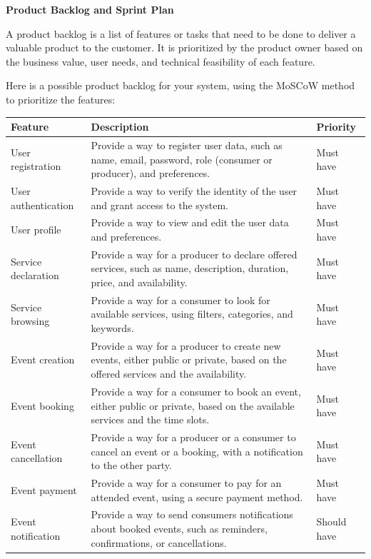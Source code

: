 \documentclass[a4paper,12pt]{article}
\begin{document}
\begin{center}
\large{\textbf{Product Backlog and Sprint Plan}}
\end{center}
\normalsize 
A product backlog is a list of features or tasks that need to be done to deliver a valuable product to the customer. It is prioritized by the product owner based on the business value, user needs, and technical feasibility of each feature.

Here is a possible product backlog for your system, using the MoSCoW method to prioritize the features:
\begin{table}[!h]
\centering
\begin{tabular}{|l|p{10cm}|l|}
\hline
\textbf{Feature} & \textbf{Description} & \textbf{Priority} \\
\hline
User registration & Provide a way to register user data, such as name, email, password, role (consumer or producer), and preferences. & Must have \\
\hline
User authentication & Provide a way to verify the identity of the user and grant access to the system. & Must have \\
\hline
User profile & Provide a way to view and edit the user data and preferences. & Must have \\
\hline
Service declaration & Provide a way for a producer to declare offered services, such as name, description, duration, price, and availability. & Must have \\
\hline
Service browsing & Provide a way for a consumer to look for available services, using filters, categories, and keywords. & Must have \\
\hline
Event creation & Provide a way for a producer to create new events, either public or private, based on the offered services and the availability. & Must have \\
\hline
Event booking & Provide a way for a consumer to book an event, either public or private, based on the available services and the time slots. & Must have \\
\hline
Event cancellation & Provide a way for a producer or a consumer to cancel an event or a booking, with a notification to the other party. & Must have \\
\hline
Event payment & Provide a way for a consumer to pay for an attended event, using a secure payment method. & Must have \\
\hline
Event notification & Provide a way to send consumers notifications about booked events, such as reminders, confirmations, or cancellations. & Should have \\

\end{tabular}
\end{table}
\end{document}

